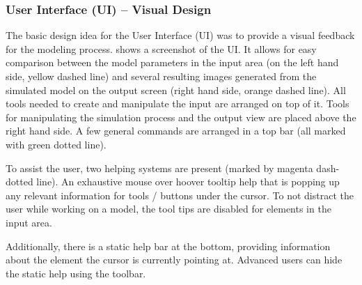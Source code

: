 

\subsubsection{User Interface (UI) -- Visual Design}
\label{sec:ui-vis}


The basic design idea for the User Interface (UI) was to provide a visual feedback for the modeling process.
 shows a screenshot of the UI.
It allows for easy comparison between the model parameters in the input area (on the left hand side, yellow dashed line) and several resulting images generated from the simulated model on the output screen (right hand side, orange dashed line).
All tools needed to create and manipulate the input are arranged on top of it.
Tools for manipulating the simulation process and the output view are placed above the right hand side.
A few general commands are arranged in a top bar (all marked with green dotted line).

To assist the user, two helping systems are present (marked by magenta dash-dotted line).
An exhaustive mouse over hoover tooltip help that is popping up any relevant information for tools / buttons under the cursor.
To not distract the user while working on a model, the tool tips are disabled for elements in the input area.

Additionally, there is a static help bar at the bottom, providing information about the element the cursor is currently pointing at.
Advanced users can hide the static help using the toolbar.

